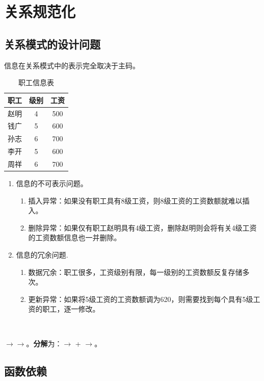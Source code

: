 \chapter{关系规范化}

\section{关系模式的设计问题}

信息在关系模式中的表示完全取决于主码。

\begin{table}[H]
  \centering
  \begin{tabular}{|c|c|c|}
    \hline
    \textbf{职工} & \textbf{级别} & \textbf{工资} \\
    \hline
    赵明 & 4 & 500 \\
    \hline
    钱广 & 5 & 600 \\
    \hline
    孙志 & 6 & 700 \\
    \hline
    李开 & 5 & 600 \\
    \hline
    周祥 & 6 & 700 \\
    \hline
  \end{tabular}
  \caption{职工信息表}
\end{table}


\begin{enumerate}
    \item 信息的不可表示问题。
    \begin{enumerate}
        \item 插入异常：如果没有职工具有8级工资，则8级工资的工资数额就难以插入。
        \item 删除异常：如果仅有职工赵明具有4级工资，删除赵明则会将有关4级工资的工资数额信息也一并删除。
    \end{enumerate}
    \item 信息的冗余问题.
    \begin{enumerate}
        \item 数据冗余：职工很多，工资级别有限，每一级别的工资数额反复存储多次。
        \item 更新异常：如果将5级工资的工资数额调为620，则需要找到每个具有5级工资的职工，逐一修改。
    \end{enumerate}
\end{enumerate}

\ 

$\to$$\to$。\textbf{分解}为：$\to$ + $\to$。

\section{函数依赖}

